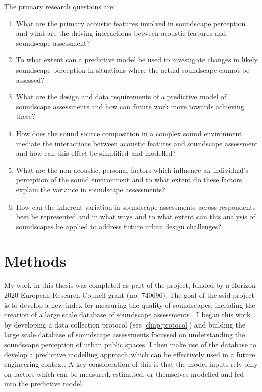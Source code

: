 The primary research questions are:

\begin{enumerate}
  \item What are the primary acoustic features involved in soundscape perception and what are the driving interactions between acoustic features and soundscape assessment?
  \item To what extent can a predictive model be used to investigate changes in likely soundscape perception in situations where the actual soundscape cannot be assessed?
  \item What are the design and data requirements of a predictive model of soundscape assessments and how can future work move towards achieving these?
  \item How does the sound source composition in a complex sound environment mediate the interactions between acoustic features and soundscape assessment and how can this effect be simplified and modelled?
  \item What are the non-acoustic, personal factors which influence an individual's perception of the sound environment and to what extent do these factors explain the variance in soundscape assessments? 
  \item How can the inherent variation in soundscape assessments across respondents best be represented and in what ways and to what extent can this analysis of soundscapes be applied to address future urban design challenges? 
\end{enumerate}

\section{Methods}

My work in this thesis was completed as part of the  project, funded by a Horizon 2020 European Research Council grant (no. 740696). The goal of the \gls{ssid} project is to develop a new index for measuring the quality of soundscapes, including the creation of a large scale database of soundscape assessments \citep{Kang2019Towards}. I began this work by developing a data collection protocol (see \cref{chap:protocol}) and building the large scale database of soundscape assessments focussed on understanding the soundscape perception of urban public spaces. I then make use of the database to develop a predictive modelling approach which can be effectively used in a future engineering context. A key consideration of this is that the model inputs rely only on factors which can be measured, estimated, or themselves modelled and fed into the predictive model. 

